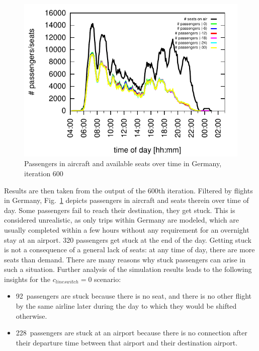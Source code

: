 \begin{figure}[t]
	\centering
	\includegraphics[width=0.9\linewidth]{./extending/figures/air/in_vehicle_histogram_flight_1876-1881_it_600.pdf}
	\caption{Passengers in aircraft and available seats over time in Germany, iteration 600}
	\label{fig:2009_passengers_seats}
\end{figure}

Results are then taken from the output of the 600th iteration. 
Filtered by flights in Germany, Fig.~\ref{fig:2009_passengers_seats} depicts passengers in aircraft and seats therein over time of day. 
Some passengers fail to reach their destination, they get stuck.   
This is considered unrealistic, as only trips within Germany are modeled, which are usually completed within a few hours without any requirement for an overnight stay at an airport. 
320 passengers get stuck at the end of the day. %
Getting stuck is not a consequence of a general lack of seats: at any time of day, there are more seats than demand.  
%
There are many reasons why stuck passengers can arise in such a situation.
%
Further analysis of the simulation results leads to the following insights for the $c_{lineswitch} = 0$ scenario:
\begin{itemize}

\item 92~passengers are stuck because there is no seat, and there is no other flight by the same airline later during the day to which they would be shifted otherwise.

\item 228~passengers are stuck at an airport because there is no connection after their departure time 
	between that airport and their destination airport. 
\end{itemize}


